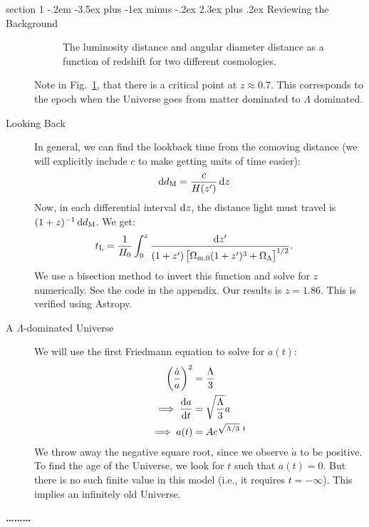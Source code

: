 \documentclass[12pt]{article}
\makeatletter
\newenvironment{problem}{\@startsection
	{section}
	{1}
	{-.2em}
	{-3.5ex plus -1ex minus -.2ex}
	{2.3ex plus .2ex}
	{\pagebreak[3]%
		\large\bf\noindent{Problem }
	}
}
{%
	\begin{center}\large\bf \ldots\ldots\ldots\end{center}}
\newcommand{\Omx}[1]{\ensuremath{\Omega_\mathrm{#1} } }
\makeatother
\begin{document}
\begin{problem}{Reviewing the Background}
\begin{description}
\begin{figure}
{\begin{minipage}{\dimexpr\textwidth-2\fboxsep-2\fboxrule}
\begin{subfigure}{0.49\textwidth}
							\caption{}
							\label{fig:subfigb}
						\end{subfigure}
						
						\vspace{0pt}
						
						\caption{The luminosity distance and angular diameter distance as a function of redshift for two different cosmologies.}
						\label{fig:distances}
					\end{minipage}
				} %
			\end{figure}

			Note in Fig.~\ref{fig:subfigb}, that there is a critical point at $z\approx0.7$.  This corresponds to the epoch when the Universe goes from matter dominated to $\Lambda$ dominated.
			
			\item[Looking Back] In general, we can find the lookback time from the comoving distance (we will explicitly include $c$ to make getting units of time easier): \begin{align*}
				\dif d_\mathrm{M} &= \frac{c}{H(z')} \dif z
			\end{align*} Now, in each differential interval $\dif z$, the distance light must travel is $(1 + z)^{-1} \dif d_\mathrm{M}$.  We get: \begin{align*}
				t_\mathrm{L} &= \frac{1}{H_0} \int_0^z \frac{\dif z'}{(1+z')\left[\Omx{m,0}(1+z')^3 + \Omx{\Lambda}\right]^{1/2}}.
			\end{align*} We use a bisection method to invert this function and solve for $z$ numerically.  See the code in the appendix.  Our results is $\boxed{z = 1.86}$.  This is verified using Astropy.
			
			\item[A $\Lambda$-dominated Universe] We will use the first Friedmann equation to solve for $a(t)$: \begin{align*}
				\left(\frac{\dot{a}}{a}\right)^2 &= \frac{\Lambda}{3}
				\\
				\implies \frac{\dif a}{\dif t} &= \sqrt{\frac{\Lambda}{3}}a
				\\
				\implies a(t) &= Ae^{\sqrt{\Lambda/3}\ t}
			\end{align*} We throw away the negative square root, since we observe $\dot{a}$ to be positive.  To find the age of the Universe, we look for $t$ such that $a(t) = 0$.  But there is no such finite value in this model (i.e., it requires $t=-\infty$).  This implies an infinitely old Universe.

		\end{description} 
	\end{problem}
	
\end{document}
